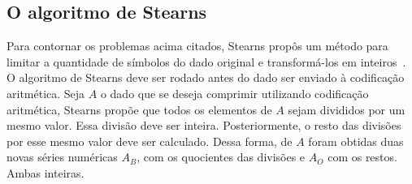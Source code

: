 



\subsection{O algoritmo de Stearns}
\label{Paragrafo:stearns}

Para contornar os problemas acima citados, Stearns
propôs um método para limitar a quantidade de símbolos do dado original e
transformá-los em inteiros~\citep{Artigo:stearn}. O algoritmo de Stearns deve
ser rodado antes do dado ser enviado à codificação aritmética. Seja $A$ o dado
que se deseja comprimir utilizando codificação aritmética, Stearns propõe que
todos os elementos de $A$ sejam divididos por um mesmo valor. Essa divisão deve
ser inteira. Posteriormente, o resto das divisões por esse mesmo valor 
deve ser calculado. Dessa forma, de $A$ foram obtidas duas novas séries
numéricas $A_B$, com os quocientes das divisões e $A_O$ com os restos. Ambas
inteiras.
 

